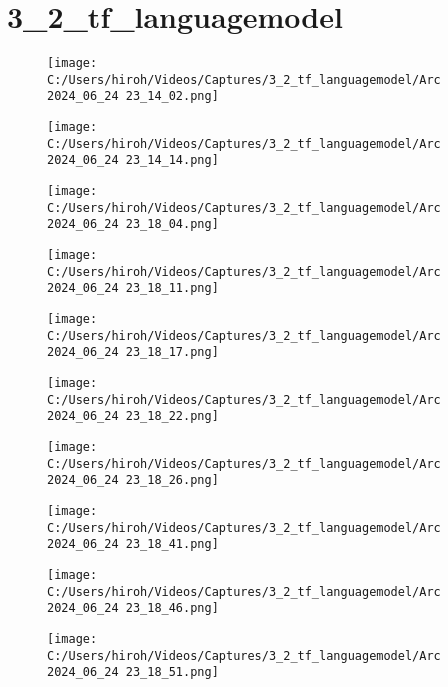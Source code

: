 \documentclass{ltjsarticle}
\begin{document}
\clearpage
\section{3\_2\_tf\_languagemodel}
\begin{figure}[htbp]
  \centering
  \texttt{[image: C:/Users/hiroh/Videos/Captures/3\_2\_tf\_languagemodel/Arc 2024\_06\_24 23\_14\_02.png]}
\end{figure}
\begin{figure}[htbp]
  \centering
  \texttt{[image: C:/Users/hiroh/Videos/Captures/3\_2\_tf\_languagemodel/Arc 2024\_06\_24 23\_14\_14.png]}
\end{figure}
\begin{figure}[htbp]
  \centering
  \texttt{[image: C:/Users/hiroh/Videos/Captures/3\_2\_tf\_languagemodel/Arc 2024\_06\_24 23\_18\_04.png]}
\end{figure}
\begin{figure}[htbp]
  \centering
  \texttt{[image: C:/Users/hiroh/Videos/Captures/3\_2\_tf\_languagemodel/Arc 2024\_06\_24 23\_18\_11.png]}
\end{figure}
\begin{figure}[htbp]
  \centering
  \texttt{[image: C:/Users/hiroh/Videos/Captures/3\_2\_tf\_languagemodel/Arc 2024\_06\_24 23\_18\_17.png]}
\end{figure}
\begin{figure}[htbp]
  \centering
  \texttt{[image: C:/Users/hiroh/Videos/Captures/3\_2\_tf\_languagemodel/Arc 2024\_06\_24 23\_18\_22.png]}
\end{figure}
\begin{figure}[htbp]
  \centering
  \texttt{[image: C:/Users/hiroh/Videos/Captures/3\_2\_tf\_languagemodel/Arc 2024\_06\_24 23\_18\_26.png]}
\end{figure}
\begin{figure}[htbp]
  \centering
  \texttt{[image: C:/Users/hiroh/Videos/Captures/3\_2\_tf\_languagemodel/Arc 2024\_06\_24 23\_18\_41.png]}
\end{figure}
\begin{figure}[htbp]
  \centering
  \texttt{[image: C:/Users/hiroh/Videos/Captures/3\_2\_tf\_languagemodel/Arc 2024\_06\_24 23\_18\_46.png]}
\end{figure}
\begin{figure}[htbp]
  \centering
  \texttt{[image: C:/Users/hiroh/Videos/Captures/3\_2\_tf\_languagemodel/Arc 2024\_06\_24 23\_18\_51.png]}
\end{figure}
\end{document}
